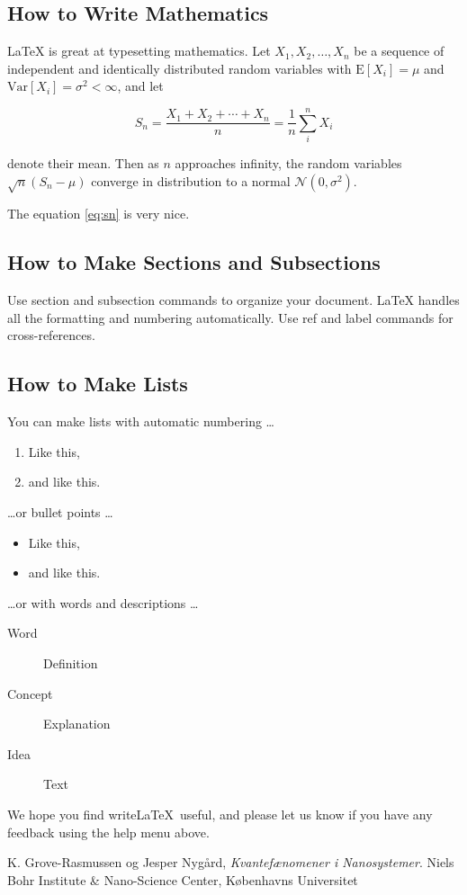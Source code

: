\documentclass[a4paper]{article}
\begin{document}
\subsection{How to Write Mathematics}

\LaTeX{} is great at typesetting mathematics. Let $X_1, X_2, \ldots, X_n$ be a sequence of independent and identically distributed random variables with $\text{E}[X_i] = \mu$ and $\text{Var}[X_i] = \sigma^2 < \infty$, and let

\begin{equation}
S_n = \frac{X_1 + X_2 + \cdots + X_n}{n}
      = \frac{1}{n}\sum_{i}^{n} X_i
\label{eq:sn}
\end{equation}

denote their mean. Then as $n$ approaches infinity, the random variables $\sqrt{n}(S_n - \mu)$ converge in distribution to a normal $\mathcal{N}(0, \sigma^2)$.

The equation \ref{eq:sn} is very nice.

\subsection{How to Make Sections and Subsections}

Use section and subsection commands to organize your document. \LaTeX{} handles all the formatting and numbering automatically. Use ref and label commands for cross-references.

\subsection{How to Make Lists}

You can make lists with automatic numbering \dots

\begin{enumerate}
\item Like this,
\item and like this.
\end{enumerate}
\dots or bullet points \dots
\begin{itemize}
\item Like this,
\item and like this.
\end{itemize}
\dots or with words and descriptions \dots
\begin{description}
\item[Word] Definition
\item[Concept] Explanation
\item[Idea] Text
\end{description}

We hope you find write\LaTeX\ useful, and please let us know if you have any feedback using the help menu above.

\begin{thebibliography}{9}
  K. Grove-Rasmussen og Jesper Nygård,
  \emph{Kvantefænomener i Nanosystemer}.
  Niels Bohr Institute \& Nano-Science Center, Københavns Universitet

\end{thebibliography}
\end{document}
